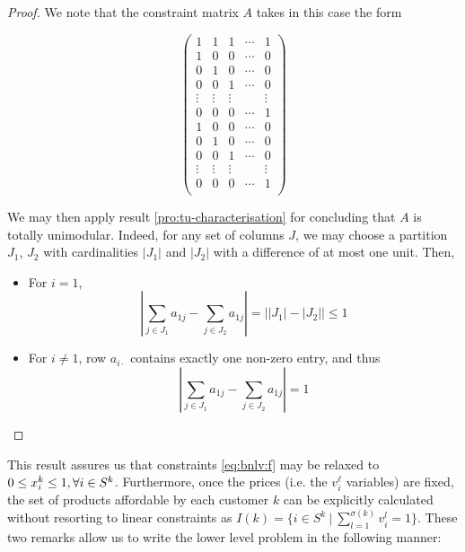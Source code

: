 \begin{proof}
    We note that the constraint matrix $A$ takes in this case the form

    \begin{equation*}
        \begin{pmatrix}
            1      & 1      & 1      & \cdots & 1     \\
            1      & 0      & 0      & \cdots & 0     \\
            0      & 1      & 0      & \cdots & 0     \\
            0      & 0      & 1      & \cdots & 0     \\
            \vdots & \vdots & \vdots &        & \vdots\\
            0      & 0      & 0      & \cdots & 1     \\
            1      & 0      & 0      & \cdots & 0     \\
            0      & 1      & 0      & \cdots & 0     \\
            0      & 0      & 1      & \cdots & 0     \\
            \vdots & \vdots & \vdots &        & \vdots\\
            0      & 0      & 0      & \cdots & 1     \\
        \end{pmatrix}
    \end{equation*}

    \noindent
    We may then apply result \ref{pro:tu-characterisation} for concluding that
    $A$ is totally unimodular. Indeed, for any set of columns $J$, we may choose
    a partition $J_1$, $J_2$ with cardinalities $|J_1|$ and $|J_2|$ with a
    difference of at most one unit. Then,
    \begin{itemize}
        \item
            For $i = 1$,
            \[
                \left| \sum_{j \in J_1} a_{1j} - \sum_{j \in J_2} a_{1j} \right|
                    = \left| |J_1| - |J_2| \right|
                    \leq 1
            \]
        \item
	    For $i \neq 1$, row $a_{i\cdot}$ contains exactly one non-zero
	    entry, and thus
            \[
                \left| \sum_{j \in J_1} a_{1j} - \sum_{j \in J_2} a_{1j} \right|
                    = 1
            \]
    \end{itemize}
\end{proof}

This result assures us that constraints \eqref{eq:bnlv:f} may be relaxed to $0
\leq x_i^k \leq 1, \forall{\ensuremath{i \in S^k}}$. Furthermore, once the prices (i.e. the
$v_i^\ell$ variables) are fixed, the set of products affordable by each customer
$k$ can be explicitly calculated without resorting to linear constraints as
$
    I(k) = \{ i \in S^k~|~\sum_{l=1}^{\sigma(k)} v_i^l = 1 \}
$.
These two remarks allow us to write the lower level problem in the following
manner:

